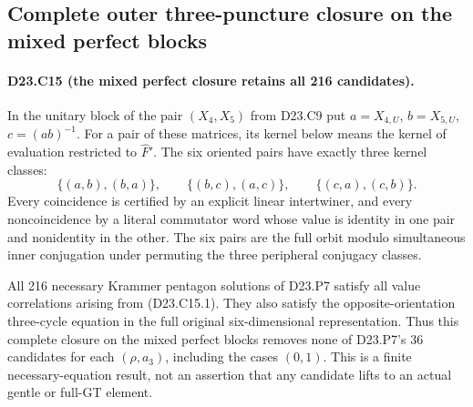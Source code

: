 \subsection{Complete outer three-puncture closure on the mixed perfect blocks}

\paragraph{D23.C15 (the mixed perfect closure retains all 216 candidates).}
In the unitary block of the pair $(X_4,X_5)$ from D23.C9 put
$a=X_{4,U}$, $b=X_{5,U}$, $c=(ab)^{-1}$. For a pair of these
matrices, its kernel below means the kernel of evaluation restricted
to $\widehat F'$. The six oriented pairs have exactly three kernel
classes:
\[
 \{(a,b),(b,a)\},\qquad
 \{(b,c),(a,c)\},\qquad
 \{(c,a),(c,b)\}.
\tag{D23.C15.1}
\]
Every coincidence is certified by an explicit linear intertwiner,
and every noncoincidence by a literal commutator word whose value
is identity in one pair and nonidentity in the other. The six pairs
are the full orbit modulo simultaneous inner conjugation under
permuting the three peripheral conjugacy classes.

All 216 necessary Krammer pentagon solutions of D23.P7 satisfy
all value correlations arising from (D23.C15.1). They also satisfy
the opposite-orientation three-cycle equation in the full original
six-dimensional representation. Thus this complete closure on the
mixed perfect blocks removes none of D23.P7's 36 candidates for
each $(\rho,a_3)$, including the cases $(0,1)$.
This is a finite necessary-equation result, not an assertion that
any candidate lifts to an actual gentle or full-GT element.

